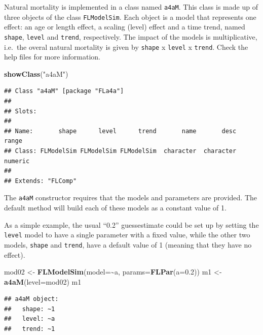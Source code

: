 \documentclass[
]{book}
\newenvironment{Shaded}{\begin{snugshade}}{\end{snugshade}}
\newcommand{\AttributeTok}[1]{\textcolor[rgb]{0.13,0.29,0.53}{#1}}
\newcommand{\FloatTok}[1]{\textcolor[rgb]{0.00,0.00,0.81}{#1}}
\newcommand{\FunctionTok}[1]{\textcolor[rgb]{0.13,0.29,0.53}{\textbf{#1}}}
\newcommand{\NormalTok}[1]{#1}
\newcommand{\OtherTok}[1]{\textcolor[rgb]{0.56,0.35,0.01}{#1}}
\newcommand{\SpecialCharTok}[1]{\textcolor[rgb]{0.81,0.36,0.00}{\textbf{#1}}}
\newcommand{\StringTok}[1]{\textcolor[rgb]{0.31,0.60,0.02}{#1}}
\begin{document}
Natural mortality is implemented in a class named \texttt{a4aM}. This class is made up of three objects of the class \texttt{FLModelSim}. Each object is a model that represents one effect: an age or length effect, a scaling (level) effect and a time trend, named \texttt{shape}, \texttt{level} and \texttt{trend}, respectively. The impact of the models is multiplicative, i.e.~the overal natural mortality is given by \texttt{shape} x \texttt{level} x \texttt{trend}. Check the help files for more information.

\begin{Shaded}
\begin{Highlighting}[]
\FunctionTok{showClass}\NormalTok{(}\StringTok{"a4aM"}\NormalTok{)}
\end{Highlighting}
\end{Shaded}

\begin{verbatim}
## Class "a4aM" [package "FLa4a"]
## 
## Slots:
##                                                                         
## Name:       shape      level      trend       name       desc      range
## Class: FLModelSim FLModelSim FLModelSim  character  character    numeric
## 
## Extends: "FLComp"
\end{verbatim}

The \texttt{a4aM} constructor requires that the models and parameters are provided. The default method will build each of these models as a constant value of 1.

As a simple example, the usual ``0.2'' guessestimate could be set up by setting the \texttt{level} model to have a single parameter with a fixed value, while the other two models, \texttt{shape} and \texttt{trend}, have a default value of 1 (meaning that they have no effect).

\begin{Shaded}
\begin{Highlighting}[]
\NormalTok{mod02 }\OtherTok{\textless{}{-}} \FunctionTok{FLModelSim}\NormalTok{(}\AttributeTok{model=}\SpecialCharTok{\textasciitilde{}}\NormalTok{a, }\AttributeTok{params=}\FunctionTok{FLPar}\NormalTok{(}\AttributeTok{a=}\FloatTok{0.2}\NormalTok{))}
\NormalTok{m1 }\OtherTok{\textless{}{-}} \FunctionTok{a4aM}\NormalTok{(}\AttributeTok{level=}\NormalTok{mod02)}
\NormalTok{m1}
\end{Highlighting}
\end{Shaded}

\begin{verbatim}
## a4aM object:
##   shape: ~1
##   level: ~a
##   trend: ~1
\end{verbatim}
\end{document}
